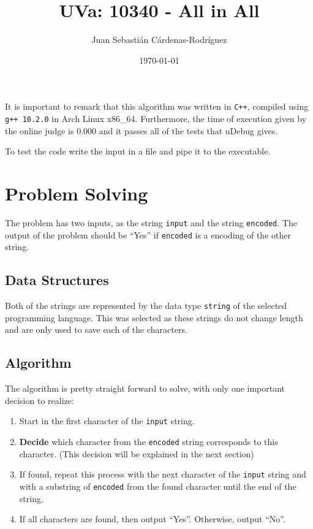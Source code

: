 \documentclass[11pt]{article}
\title{UVa: 10340 - All in All}
\author{Juan Sebasti\'an C\'ardenas-Rodríguez \\
  \scalebox{0.7}{Mathematical Engineering, Universidad EAFIT}}
\date{\today}
\theoremstyle{definition}
\theoremstyle{remark}
\theoremstyle{remark}
\begin{document}
\maketitle

It is important to remark that this algorithm was written in \texttt{C++},
compiled using \texttt{g++ 10.2.0} in Arch Linux x86\_64. Furthermore, the time
of execution given by the online judge is 0.000 and it passes all of the tests
that uDebug gives.

To test the code write the input in a file and pipe it to the executable.

\section{Problem Solving}
The problem has two inputs, as the string \texttt{input} and the string
\texttt{encoded}. The output of the problem should be ``Yes'' if
\texttt{encoded} is a encoding of the other string.

\subsection{Data Structures}
Both of the strings are represented by the data type \texttt{string} of the
selected programming language. This was selected as these strings do not change
length and are only used to save each of the characters.

\subsection{Algorithm}
The algorithm is pretty straight forward to solve, with only one important
decision to realize:
%
\begin{enumerate}
  \item Start in the first character of the \texttt{input} string.

  \item \textbf{Decide} which character from the \texttt{encoded} string corresponds
  to this character. (This decision will be explained in the next section)

  \item If found, repeat this process with the next character of the \texttt{input}
  string and with a substring of \texttt{encoded} from the found character until the end
  of the string.

  \item If all characters are found, then output ``Yes''. Otherwise, output ``No''.
\end{enumerate}
\end{document}
